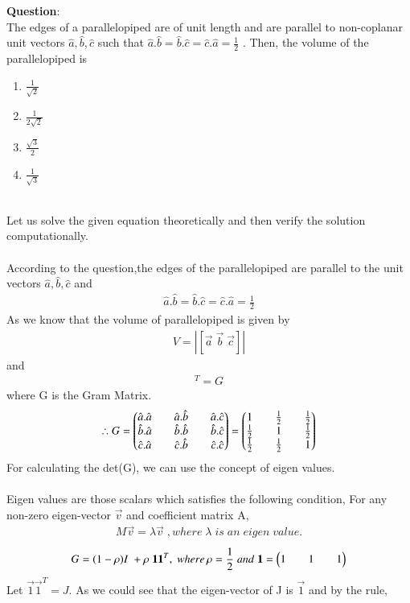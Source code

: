 \documentclass[journal]{IEEEtran}
\begin{document}
\textbf{Question}:\\
The edges of a parallelopiped are of unit length and are parallel to non-coplanar unit vectors $\hat{a},\hat{b},\hat{c}$ such that $\hat{a}.\hat{b}=\hat{b}.\hat{c}=\hat{c}.\hat{a}=\frac{1}{2}$ . Then, the volume of the parallelopiped is
\begin{multicols}{4}
\begin{enumerate}
    \item $\frac{1}{\sqrt{2}}$
    \item $\frac{1}{2\sqrt{2}}$
    \item $\frac{\sqrt{3}}{2}$
    \item $\frac{1}{\sqrt{3}}$
\end{enumerate}
\end{multicols}
\solution \\
Let us solve the given equation theoretically and then verify the solution computationally.\\
\\
According to the question,the edges of the parallelopiped are parallel to the unit vectors $\hat{a},\hat{b},\hat{c}$ and\\
\begin{align*}
    \hat{a}.\hat{b}=\hat{b}.\hat{c}=\hat{c}.\hat{a}=\frac{1}{2}
\end{align*}
As we know that the volume of parallelopiped is given by
\begin{align*}
    V=|[\vec{a}\;\vec{b}\;\vec{c}]|
\end{align*}
and
\begin{align*}
    [\vec{a}\;\vec{b}\;\vec{c}][\vec{a}\;\vec{b}\;\vec{c}]^T=G
\end{align*}
where G is the Gram Matrix.
\begin{align*}
    \therefore G=\begin{pmatrix}\hat{a}.\hat{a}&&\hat{a}.\hat{b}&&\hat{a}.\hat{c} \\ \hat{b}.\hat{a}&& \hat{b}.\hat{b}&& \hat{b}.\hat{c} \\ \hat{c}.\hat{a}&& \hat{c}.\hat{b}&& \hat{c}.\hat{c}\end{pmatrix}=\begin{pmatrix}1&&\frac{1}{2}&&\frac{1}{2}\\ \frac{1}{2}&&1&&\frac{1}{2}\\ \frac{1}{2}&&\frac{1}{2}&&1\end{pmatrix}
\end{align*}
For calculating the det(G), we can use the concept of eigen values.\\
\\
Eigen values are those scalars which satisfies the following condition,
For any non-zero eigen-vector $\vec{v}$ and coefficient matrix A,
\begin{align*}
    M\vec{v}=\lambda \vec{v} \; , where \; \lambda \;is\; an \;eigen\; value.
\end{align*}
\begin{align*}
     G=(1-\rho)I\;+\rho\;\mathbf{1}\mathbf{1}^T, \; where\, \rho=\frac{1}{2}\;and\;\mathbf{1}=\begin{pmatrix}1&&1&&1\end{pmatrix}
\end{align*}
Let $\vec{1}\vec{1}^T=J$. As we could see that the eigen-vector of J is $\vec{1}$ and by the rule,
\newpage
\vspace*{0.25cm}
\end{document}
